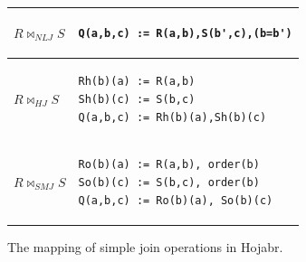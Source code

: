 \begin{figure}[t!]
\begin{tabular}{|l|l|}
\hline
$R\bowtie_{NLJ} S$  &
\begin{lstlisting}
Q(a,b,c) := R(a,b),S(b',c),(b=b')
\end{lstlisting} \\ \hline
$R\bowtie_{HJ} S$  &
\begin{lstlisting}
Rh(b)(a) := R(a,b)
Sh(b)(c) := S(b,c)
Q(a,b,c) := Rh(b)(a),Sh(b)(c)
\end{lstlisting} \\ \hline
$R\bowtie_{SMJ} S$  &
\begin{lstlisting}
Ro(b)(a) := R(a,b), order(b)
So(b)(c) := S(b,c), order(b)
Q(a,b,c) := Ro(b)(a), So(b)(c)
\end{lstlisting} \\ \hline
\end{tabular}
\vspace{-0.3cm}
\caption{The mapping of simple join operations in Hojabr.}
\label{fig:simplejoin}
\vspace{-0.3cm}
\end{figure}
